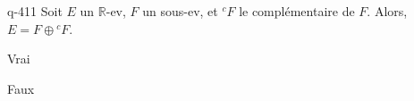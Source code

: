 \begin{truefalse}{q-411}
Soit $E$ un $\mathbb R$-ev, $F$ un sous-ev, et ${}^c F$ le complémentaire de $F$. Alors, $E = F \oplus {}^c F$.
\item Vrai
\item* Faux
\end{truefalse}

